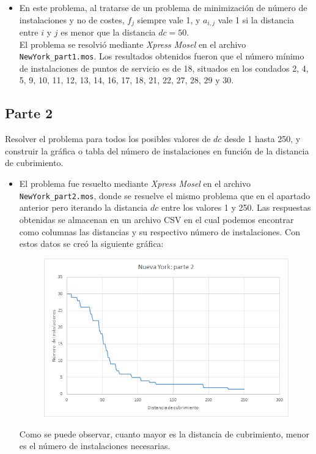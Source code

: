 \documentclass[a4paper,11pt]{article}
\begin{document}
\begin{itemize}\item[]
En este problema, al tratarse de un problema de minimización de número de instalaciones y no de costes, ${f_j}$ siempre vale 1, y ${a_{i,j}}$ vale 1 si la distancia entre ${i}$ y ${j}$ es menor que la distancia ${dc=50}$.\\

El problema se resolvió mediante \textit{Xpress Mosel} en el archivo \texttt{NewYork\_part1.mos}. Los resultados obtenidos fueron que el número mínimo de instalaciones de puntos de servicio es de 18, situados en los condados 2, 4, 5, 9, 10, 11, 12, 13, 14, 16, 17, 18, 21, 22, 27, 28, 29 y 30.
\end{itemize}

\subsection{Parte 2}
Resolver el problema para todos los posibles valores de ${dc}$ desde 1 hasta 250, y construir la gráfica o tabla del número de instalaciones en función de la distancia de cubrimiento.

\begin{itemize}\item[]
El problema fue resuelto mediante \textit{Xpress Mosel} en el archivo \texttt{NewYork\_part2.mos}, donde se resuelve el mismo problema que en el apartado anterior pero iterando la distancia ${dc}$ entre los valores 1 y 250. Las respuestas obtenidas se almacenan en un archivo CSV en el cual podemos encontrar como columnas las distancias y su respectivo número de instalaciones. Con estos datos se creó la siguiente gráfica:

\begin{figure}[!htbp]
	\centering
	\includegraphics[width=1\textwidth]{NewYork_part2.png}
\end{figure}

Como se puede observar, cuanto mayor es la distancia de cubrimiento, menor es el número de instalaciones necesarias.
\end{itemize}
\end{document}
